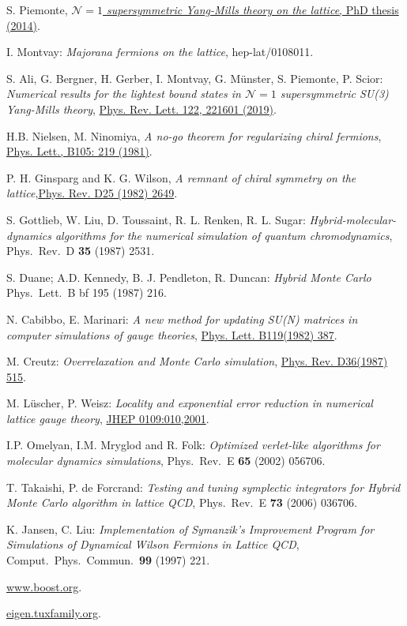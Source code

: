 \documentclass[11pt,a4paper]{article}
\newcommand{\fdoi}[2]{\href{http://dx.doi.org/\detokenize{#1}}{#2}}
\begin{document}
\begin{thebibliography}{100}

S. Piemonte, \href{https://www.uni-muenster.de/imperia/md/content/physik_tp/theses/muenster/piemonte_dr.pdf}{\emph{$\mathcal{N}=1$ supersymmetric Yang-Mills theory on the lattice}, PhD thesis (2014)}.

I. Montvay: \emph{Majorana fermions on the lattice}, hep-lat/0108011.

S. Ali, G. Bergner, H. Gerber, I. Montvay, G. M\"unster, S. Piemonte, P. Scior: \emph{Numerical results for the lightest bound states in $\mathcal{N}=1$ supersymmetric SU(3) Yang-Mills theory}, \fdoi{10.1103/PhysRevLett.122.221601}{Phys. Rev. Lett. 122, 221601 (2019)}.

H.B. Nielsen, M. Ninomiya, \emph{A no-go theorem for regularizing chiral fermions}, \fdoi{10.1016/0370-2693(81)91026-1}{Phys. Lett., B105: 219 (1981)}.

P. H. Ginsparg and K. G. Wilson, \emph{A remnant of chiral symmetry on the lattice},\fdoi{10.1103/PhysRevD.25.2649}{Phys. Rev. D25 (1982) 2649}.

S. Gottlieb, W. Liu, D. Toussaint, R. L. Renken, R. L. Sugar:
\emph{Hybrid-molecular-dynamics algorithms for the numerical simulation of quantum chromodynamics},
Phys.\ Rev.\ D {\bf 35} (1987) 2531.

S. Duane; A.D. Kennedy, B. J. Pendleton, R. Duncan: 
\emph{Hybrid Monte Carlo}
Phys.\ Lett.\ B {bf 195} (1987) 216.

N. Cabibbo, E. Marinari: \emph{A new method for updating SU(N) matrices in computer simulations of gauge theories}, \fdoi{10.1016/0370-2693(82)90696-7}{Phys. Lett. B119(1982) 387}.

M. Creutz: \emph{Overrelaxation and Monte Carlo simulation}, \fdoi{10.1103/PhysRevD.36.515}{Phys. Rev. D36(1987) 515}.

M. L\"uscher, P. Weisz: \emph{Locality and exponential error reduction in numerical lattice gauge theory}, \fdoi{10.1088/1126-6708/2001/09/010}{JHEP 0109:010,2001}.

I.P. Omelyan, I.M. Mryglod and R. Folk:
\emph{Optimized verlet-like algorithms for molecular dynamics simulations},
Phys.\ Rev.\ E {\bf 65} (2002) 056706.

T. Takaishi, P. de Forcrand:
\emph{Testing and tuning symplectic integrators for Hybrid Monte Carlo algorithm in lattice QCD},
Phys.\ Rev.\ E {\bf 73} (2006) 036706.

K. Jansen, C. Liu:
\emph{Implementation of Symanzik's Improvement Program for Simulations of Dynamical Wilson Fermions in Lattice QCD},
Comput.\ Phys.\ Commun.\ {\bf 99} (1997) 221.

\href{https://www.boost.org/}{www.boost.org}.

\href{http://eigen.tuxfamily.org/}{eigen.tuxfamily.org}.

\end{thebibliography}
\end{document}

